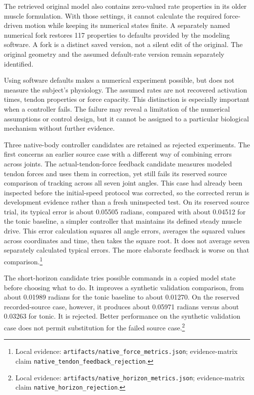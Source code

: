 The retrieved original model also contains zero-valued rate properties in its older muscle formulation. With those settings, it cannot calculate the required force-driven motion while keeping its numerical states finite. A separately named numerical fork restores 117 properties to defaults provided by the modeling software. A fork is a distinct saved version, not a silent edit of the original. The original geometry and the assumed default-rate version remain separately identified.\cite{opensim2018}

Using software defaults makes a numerical experiment possible, but does not measure the subject's physiology. The assumed rates are not recovered activation times, tendon properties or force capacity. This distinction is especially important when a controller fails. The failure may reveal a limitation of the numerical assumptions or control design, but it cannot be assigned to a particular biological mechanism without further evidence.

Three native-body controller candidates are retained as rejected experiments. The first concerns an earlier source case with a different way of combining errors across joints. The actual-tendon-force feedback candidate measures modeled tendon forces and uses them in correction, yet still fails its reserved source comparison of tracking across all seven joint angles. This case had already been inspected before the initial-speed protocol was corrected, so the corrected rerun is development evidence rather than a fresh uninspected test. On its reserved source trial, its typical error is about 0.05505 radians, compared with about 0.04512 for the tonic baseline, a simpler controller that maintains its defined steady muscle drive. This error calculation squares all angle errors, averages the squared values across coordinates and time, then takes the square root. It does not average seven separately calculated typical errors. The more elaborate feedback is worse on that comparison.\footnote{Local evidence: \texttt{artifacts/native\_force\_metrics.json}; evidence-matrix claim \texttt{\mbox{native}\_\allowbreak{}\mbox{tendon}\_\allowbreak{}\mbox{feedback}\_\allowbreak{}\mbox{rejection}}.}

The short-horizon candidate tries possible commands in a copied model state before choosing what to do. It improves a synthetic validation comparison, from about 0.01989 radians for the tonic baseline to about 0.01270. On the reserved recorded-source case, however, it produces about 0.05971 radians versus about 0.03263 for tonic. It is rejected. Better performance on the synthetic validation case does not permit substitution for the failed source case.\footnote{Local evidence: \texttt{artifacts/native\_horizon\_metrics.json}; evidence-matrix claim \texttt{\mbox{native}\_\allowbreak{}\mbox{horizon}\_\allowbreak{}\mbox{rejection}}.}

